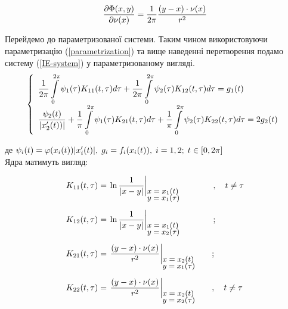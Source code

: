 \documentclass[14pt,a4paper]{extarticle}
\newcounter{e}
\numberwithin{equation}{section}
\newcommand{\intl}{\int\limits}
\newcommand{\inttwopi}{\intl_{0}^{2\pi}}
\begin{document}
\begin{equation}
	\pdv{\Phi(x, y)}{\nu(x)} = \frac{1}{2\pi} \frac{(y - x) \cdot \nu(x)}{r^2} 
\end{equation}


Перейдемо до параметризованої системи. Таким чином використовуючи параметризацію (\ref{parametrization}) та вище наведенні перетворення подамо систему (\ref{IE-system}) у параметризованому вигляді.
\begin{equation}
\label{IE-parametrized-with-specia}
	\left\{
	\begin{array}{l}
		\displaystyle
		\frac{1}{2\pi} \inttwopi \psi_1(\tau) K_{11}(t, \tau) d \tau
		+ \frac{1}{2\pi} \inttwopi  \psi_2(\tau) K_{12}(t, \tau) d \tau
		= g_{1}(t)
		\\ [0.3cm]
		\displaystyle
		\frac{\psi_2(t)}{\abs{x'_{2}(t)) }}
		+ \frac{1}{\pi} \inttwopi \psi_1(\tau) K_{21}(t, \tau) d \tau
		+ \frac{1}{\pi} \inttwopi  \psi_2(\tau) K_{22}(t, \tau) d \tau
		= 2g_{2}(t)
	\end{array}\right.
\end{equation}

де $\displaystyle \psi_{i}(t) = \varphi(x_{i}(t)) \abs{x'_{i}(t)}, \; g_{i} = f_{i}(x_{i}(t)), \;  i  = 1, 2; \; t \in [0, 2\pi]$ \\[0.3cm]
Ядра матимуть вигляд:

$$
	\begin{array}{l}
		\displaystyle
		K_{11}(t, \tau) = \left.
			 \ln{\frac{1}{\abs{x - y}}}
		\right|_{
			{\small \parbox{20mm}{$ x = x_1(t)$ \\[-3pt] $y = x_1 ({\tau})$}}
		} \quad \quad, \quad t \neq \tau
		\\ [0.8cm]
		
		\displaystyle
		K_{12}(t, \tau) = \left.
			\ln{\frac{1}{\abs{x - y}}}
		\right|_{
			{\small \parbox{20mm}{$ x = x_1(t)$ \\[-3pt] $y = x_2 ({\tau})$}}
		} \quad \quad;
		\\ [0.8cm]
		
		\displaystyle
		K_{21}(t, \tau) = \left.
			\frac{(y - x) \cdot \nu(x)}{r^2}
		\right|_{
			{\small \parbox{20mm}{$ x = x_2(t)$ \\[-3pt] $y = x_1 ({\tau})$}}
		};
		\\ [0.8cm]
		
		\displaystyle
		K_{22}(t, \tau) = \left.
			\frac{(y - x) \cdot \nu(x)}{r^2}
		\right|_{
			{\small \parbox{20mm}{$ x = x_2(t)$ \\[-3pt] $y = x_2 ({\tau})$}}
		} 
		, \quad t \neq \tau
	\end{array}
$$
\end{document}
